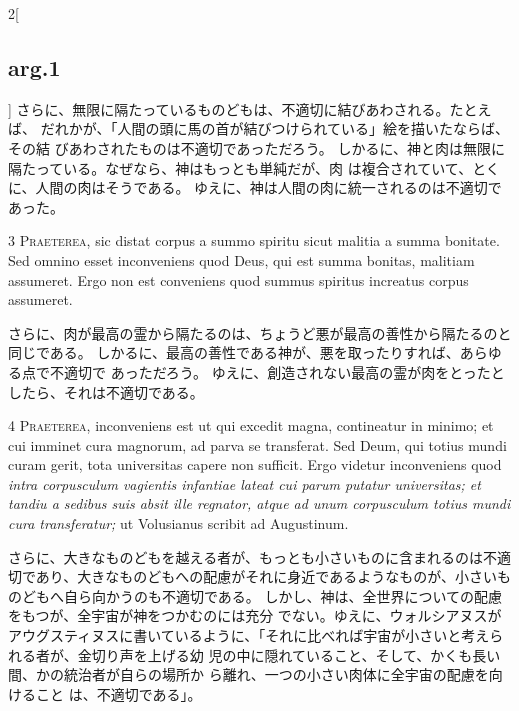 \documentclass[paper=a4paper,fontsize=10pt,jafontsize=9pt,titlepage]{jlreq}
\begin{document}
\begin{paracol}{2}[\subsection{arg.1}]
さらに、無限に隔たっているものどもは、不適切に結びあわされる。たとえば、
 だれかが、「人間の頭に馬の首が結びつけられている」絵を描いたならば、その結
 びあわされたものは不適切であっただろう。
しかるに、神と肉は無限に隔たっている。なぜなら、神はもっとも単純だが、肉
 は複合されていて、とくに、人間の肉はそうである。
ゆえに、神は人間の肉に統一されるのは不適切であった。


3 {\scshape Praeterea}, sic distat corpus a summo spiritu sicut malitia a summa
bonitate. Sed omnino esset inconveniens quod Deus, qui est summa
bonitas, malitiam assumeret. Ergo non est conveniens quod summus
spiritus increatus corpus assumeret.

\switchcolumn

さらに、肉が最高の霊から隔たるのは、ちょうど悪が最高の善性から隔たるのと
 同じである。
しかるに、最高の善性である神が、悪を取ったりすれば、あらゆる点で不適切で
 あっただろう。
ゆえに、創造されない最高の霊が肉をとったとしたら、それは不適切である。


4 {\scshape Praeterea}, inconveniens est ut qui excedit magna, contineatur in
minimo; et cui imminet
 cura magnorum, ad parva se transferat. Sed Deum,
qui totius mundi curam gerit, tota universitas capere non sufficit. Ergo
videtur inconveniens quod {\itshape intra corpusculum vagientis
 infantiae lateat
cui parum putatur universitas; et tandiu a sedibus suis absit ille
regnator, atque ad unum corpusculum totius mundi cura transferatur;} ut
Volusianus scribit ad Augustinum.

\switchcolumn

さらに、大きなものどもを越える者が、もっとも小さいものに含まれるのは不適
切であり、大きなものどもへの配慮がそれに身近であるようなものが、小さいも
のどもへ自ら向かうのも不適切である。
しかし、神は、全世界についての配慮をもつが、全宇宙が神をつかむのには充分
 でない。ゆえに、ウォルシアヌスがアウグスティヌスに書いているように、「それに比べれば宇宙が小さいと考えられる者が、金切り声を上げる幼
 児の中に隠れていること、そして、かくも長い間、かの統治者が自らの場所か
 ら離れ、一つの小さい肉体に全宇宙の配慮を向けること
 は、不適切である」。


\end{paracol}
\end{document}
